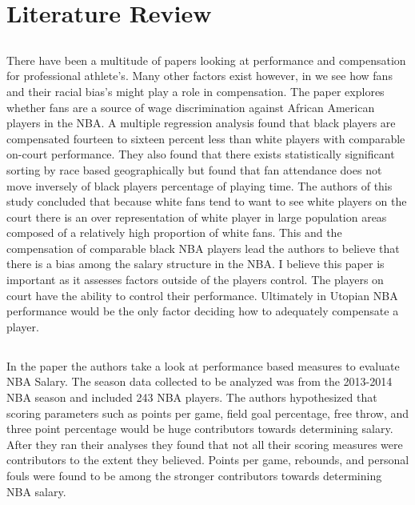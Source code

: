 \documentclass[12pt,english]{article}
\begin{document}
\section{Literature Review}\label{sec:litreview}
\subsection{}There have been a multitude of papers looking at performance and compensation for professional athlete's. Many other factors exist however, in \cite{10.2307/3487275} we see how fans and their racial bias's might play a role in compensation. The paper explores whether fans are a source of wage discrimination against African American players in the NBA. A multiple regression analysis found that black players are compensated fourteen to sixteen percent less than white players with comparable on-court performance. They also found that there exists statistically significant sorting by race based geographically but found that fan attendance does not move inversely of black players percentage of playing time. The authors of this study concluded that because white fans tend to want to see white players on the court there is an over representation of white player in large population areas composed of a relatively high proportion of white fans. This and the compensation of comparable black NBA players lead the authors to believe that there is a bias among the salary structure in the NBA. I believe this paper is important as it assesses factors outside of the players control. The players on court have the ability to control their performance. Ultimately in Utopian NBA performance would be the only factor deciding how to adequately compensate a player.
\subsection{}
In the paper \cite{10342295720150501} the authors take a look at performance based measures to evaluate NBA Salary. The season data collected to be analyzed was from the 2013-2014 NBA season and included 243 NBA players. The authors hypothesized that scoring parameters such as points per game, field goal percentage, free throw, and three point percentage would be huge contributors towards determining salary. After they ran their analyses they found that not all their scoring measures were contributors to the extent they believed. Points per game, rebounds, and personal fouls were found to be among the stronger contributors towards determining NBA salary.
\end{document}
